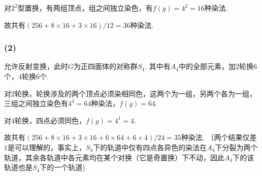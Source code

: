 对$2^2$型置换，有两组顶点，组之间独立染色，有$f(g)=4^2=16$种染法.

故共有$(256+8\times16+3\times16)/12=36$种染法.

\subsubsection{(2)}
允许反射变换，此时$G$为正四面体的对称群$S_4$. 其中有$A_4$中的全部元素，加$2$轮换$6$个，$4$轮换$6$个.

对$2$轮换，轮换涉及的两个顶点必须染相同色，这两个为一组，另两个各为一组，三组之间独立染色有$4^3=64$种染法，$f(g)=64$.

对$4$轮换，四点必须同色，$f(g)=4^1=4$.

故共有$(256+8\times16+3\times16+6\times64+6\times4)/24=35$种染法. （两个结果仅差$1$是可以理解的，事实上，$S_4$下的轨道中仅有四点各异色的染法在$A_4$下分裂为两个轨道，其余各轨道中各元素均在某个对换（它是奇置换）下不动，因此$A_4$下的该轨道也是$S_4$下的一个轨道)